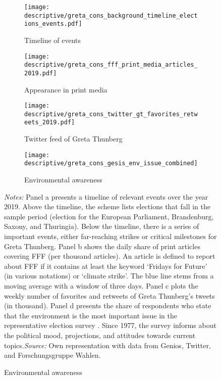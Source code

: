 \begin{landscape}
	\vspace*{\fill}
	\begin{figure}[H]\centering\caption{Important events surrounding FFF, perception in (social) media, and environmental awareness in 2019}\label{fig_greta_cons:timeline_media_awareness}
		\begin{subfigure}[h]{0.99\linewidth}\centering\caption{Timeline of events}
			\texttt{[image: descriptive/greta\_cons\_background\_timeline\_elections\_events.pdf]}
		\end{subfigure}
		
		\par\bigskip\smallskip %
		\begin{subfigure}[h]{0.33\linewidth}\centering\caption{Appearance in print media}
			\texttt{[image: descriptive/greta\_cons\_fff\_print\_media\_articles\_2019.pdf]}
		\end{subfigure}
		\begin{subfigure}[h]{0.33\linewidth}\centering\caption{Twitter feed of Greta Thunberg}
			\texttt{[image: descriptive/greta\_cons\_twitter\_gt\_favorites\_retweets\_2019.pdf]}
		\end{subfigure}
		\begin{subfigure}[h]{0.33\linewidth}\centering\caption{Environmental awareness}
			\texttt{[image: descriptive/greta\_cons\_gesis\_env\_issue\_combined]}
		\end{subfigure}

		\begin{minipage}{\linewidth}
			\scriptsize{\emph{Notes:} Panel a presents a timeline of relevant events over the year 2019. Above the timeline, the scheme lists elections that fall in the sample period (election for the European Parliament, Brandenburg, Saxony, and Thuringia). Below the timeline, there is a series of important events, either far-reaching strikes or critical milestones for Greta Thunberg. Panel b shows the daily share of print articles covering FFF (per thousand articles). An article is defined to report about FFF if it contains at least the keyword `Fridays for Future' (in various notations) or `climate strike'. The blue line stems from a moving average with a window of three days. Panel c plots the weekly number of favorites and retweets of Greta Thunberg's tweets (in thousand). Panel d presents the share of respondents who state that the environment is the most important issue in the representative election survey \cite{politbarometer2019}. Since 1977, the survey informs about the political mood, projections, and attitudes towards current topics.\newline \emph{Source:} Own representation with data from Genios, Twitter, and Forschungsgruppe Wahlen.}
		\end{minipage}
	\end{figure}
	\vspace*{\fill}\clearpage
\end{landscape}
